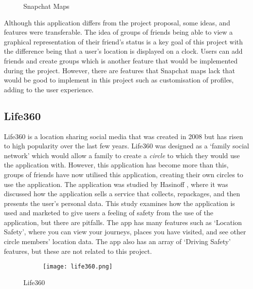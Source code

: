 \begin{figure}[!htbp]
    \centering
    \begin{subfigure}[b]{0.6\textwidth}
    \end{subfigure}
    \caption[Snapchat Maps]{Snapchat Maps \cite{snapMapImg}}
    \label{fig:snapMap}
\end{figure}
\FloatBarrier

Although this application differs from the project proposal, some ideas, and features were transferable. The idea of groups of friends being able to view a graphical representation of their friend's status is a key goal of this project with the difference being that a user's location is displayed on a clock. Users can add friends and create groups which is another feature that would be implemented during the project. However, there are features that Snapchat maps lack that would be good to implement in this project such as customisation of profiles, adding to the user experience.

\subsection{Life360}

Life360 is a location sharing social media that was created in 2008 but has risen to high popularity over the last few years. Life360 was designed as a `family social network' which would allow a family to create a \textit{circle} to which they would use the application with. However, this application has become more than this, groups of friends have now utilised this application, creating their own circles to use the application. The application was studied by Hasinoff \cite{life360}, where it was discussed how the application sells a service that collects, repackages, and then presents the user's personal data. This study examines how the application is used and marketed to give users a feeling of safety from the use of the application, but there are pitfalls. The app has many features such as `Location Safety', where you can view your journeys, places you have visited, and see other circle members' location data. The app also has an array of `Driving Safety' features, but these are not related to this project. 

\begin{figure}[!htbp]
    \centering
    \begin{subfigure}[b]{0.21\textwidth}
        {\texttt{[image: life360.png]}}
    \end{subfigure}
    \caption[Life360]{Life360 \cite{lifeLoc}}
    \label{fig:life360}
\end{figure}
\FloatBarrier

